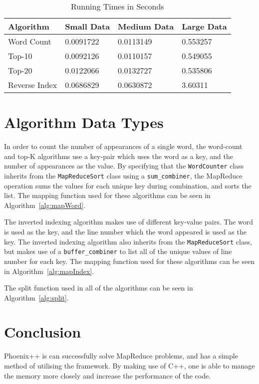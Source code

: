 \documentclass[12pt,onecolumn]{IEEEtran}
\begin{document}
	\begin{table}[h]
		\centering \caption{Running Times in Seconds} \label{tbl:time}
		\begin{tabular}{llll}
			\hline
			Algorithm     & Small Data & Medium Data & Large Data \\ \hline
			Word Count    & 0.0091722  & 0.0113149   & 0.553257   \\
			Top-10        & 0.0092126  & 0.0110157   & 0.549055   \\
			Top-20        & 0.0122066  & 0.0132727   & 0.535806   \\
			Reverse Index & 0.0686829  & 0.0630872   & 3.60311    \\ \hline
		\end{tabular}
	\end{table}

	\section{Algorithm Data Types}
	
	In order to count the number of appearances of a single word, the word-count and top-K algorithms use a key-pair which uses the word as a key, and the number of appearances as the value. By specifying that the \verb|WordCounter| class inherits from the \verb|MapReduceSort| class using a \verb|sum_combiner|, the MapReduce operation sums the values for each unique key during combination, and sorts the list. The mapping function used for these algorithms can be seen in Algorithm~\ref{alg:mapWord}.
	
	The inverted indexing algorithm makes use of different key-value pairs. The word is used as the key, and the line number which the word appeared is used as the key. The inverted indexing algorithm also inherits from the \verb|MapReduceSort| class, but makes use of a \verb|buffer_combiner| to list all of the unique values of line number for each key. The mapping function used for these algorithms can be seen in Algorithm~\ref{alg:mapIndex}.
	
	The split function used in all of the algorithms can be seen in Algorithm~\ref{alg:split}.
	
	\section{Conclusion}
	
	Phoenix++ is can successfully solve MapReduce problems, and has a simple method of utilising the framework. By making use of C++, one is able to manage the memory more closely and increase the performance of the code.
	
\end{document}
